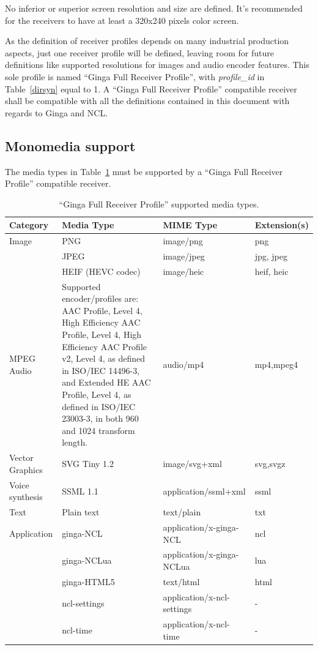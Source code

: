 \documentclass[11pt]{article}
\begin{document}
No inferior or superior screen resolution and size are defined. It's
recommended for the receivers to have at least a 320x240 pixels color
screen.

As the definition of receiver profiles depends on many industrial production
aspects, just one receiver profile will be defined, leaving room for future
definitions like supported resolutions for images and audio encoder
features. This sole profile is named ``Ginga Full Receiver Profile'', with
\emph{profile\_id} in Table~\ref{dirsyn} equal to 1. A ``Ginga Full Receiver
Profile'' compatible receiver shall be compatible with all the
definitions contained in this document with regards to Ginga and NCL.

\subsection{Monomedia support}
The media types in Table~\ref{mediatypes} must be supported by a
``Ginga Full Receiver Profile'' compatible receiver.

\begin{table}[H]
\centering
\caption{``Ginga Full Receiver Profile'' supported media types.}
\label{mediatypes}
\begin{tabularx}{\textwidth}{|p{2.5cm}|X|X|p{2.8cm}|}
  \hline
  Category & Media Type & MIME Type & Extension(s) \\
  \hline
  Image & PNG & image/png & png \\
  \cline{2-4}
   & JPEG & image/jpeg & jpg, jpeg \\
  \cline{2-4}
   & HEIF (HEVC codec) & image/heic & heif, heic \\
  \hline
  MPEG Audio & Supported encoder/profiles are: AAC Profile, Level 4, High 
  Efficiency AAC Profile, Level 4, High Efficiency AAC Profile v2, Level 4, 
  as defined in ISO/IEC 14496-3, and Extended HE AAC Profile, Level 4, as 
  defined in ISO/IEC 23003-3, in both 960 and 1024 transform length. & audio/mp4 & mp4,mpeg4 \\
  \hline
  Vector Graphics & SVG Tiny 1.2 & image/svg+xml & svg,svgz \\
  \hline
  Voice synthesis & SSML 1.1 & application/ssml+xml & ssml \\
  \hline
  Text & Plain text & text/plain & txt \\
  \hline
  Application & ginga-NCL & application/x-ginga-NCL & ncl \\
  \cline{2-4}
   & ginga-NCLua & application/x-ginga-NCLua & lua \\
  \cline{2-4}
   & ginga-HTML5 & text/html & html \\
  \cline{2-4}
   & ncl-settings & application/x-ncl-settings & - \\
  \cline{2-4}
   & ncl-time & application/x-ncl-time & - \\
  \hline
\end{tabularx}
\end{table}
\end{document}
